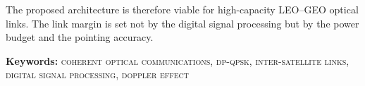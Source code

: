 The proposed architecture is therefore viable for high-capacity LEO--GEO
optical links. The link margin is set not by the digital signal processing but
by the power budget and the pointing accuracy.

\vspace{1.5em}
\noindent\textbf{Keywords:}
\textsc{coherent optical communications, dp-qpsk, inter-satellite links, digital
signal processing, doppler effect}



\cleardoublepage
